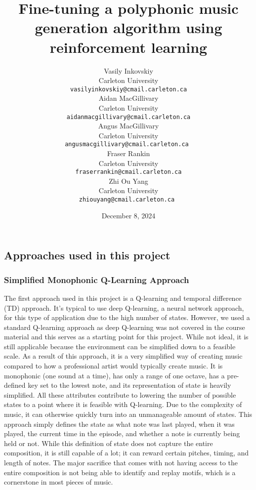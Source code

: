 \documentclass{article}
\title{ Fine-tuning a polyphonic music generation algorithm using reinforcement learning
}
\author{ 
Vasily Inkovskiy \\ 
Carleton University  \\
  \texttt{ vasilyinkovskiy@cmail.carleton.ca }\\
  Aidan MacGillivary\\ Carleton University  \\
  \texttt{aidanmacgillivary@cmail.carleton.ca} \\
  Angus MacGillivary\\
  Carleton University\\
  \texttt{angusmacgillivary@cmail.carleton.ca }\\
  Fraser Rankin\\Carleton University\\
  \texttt{fraserrankin@cmail.carleton.ca} \\
  Zhi Ou Yang \\Carleton University\\
  \texttt{zhiouyang@cmail.carleton.ca }}
\date{December 8, 2024}
\begin{document}
\maketitle{}

\subsection{Approaches used in this project}
\subsubsection{Simplified Monophonic Q-Learning Approach}
The first approach used in this project is a Q-learning and temporal difference (TD) approach. It's typical to use deep Q-learning, a neural network approach, for this type of application due to the high number of states. However, we used a standard Q-learning approach as deep Q-learning was not covered in the course material and this serves as a starting point for this project. While not ideal, it is still applicable because the environment can be simplified down to a feasible scale. As a result of this approach, it is a very simplified way of creating music compared to how a professional artist would typically create music. It is monophonic (one sound at a time), has only a range of one octave, has a pre-defined key set to the lowest note, and its representation of state is heavily simplified. All these attributes contribute to lowering the number of possible states to a point where it is feasible with Q-learning. Due to the complexity of music, it can otherwise quickly turn into an unmanageable amount of states. This approach simply defines the state as what note was last played, when it was played, the current time in the episode, and whether a note is currently being held or not. While this definition of state does not capture the entire composition, it is still capable of a lot; it can reward certain pitches, timing, and length of notes. The major sacrifice that comes with not having access to the entire composition is not being able to identify and replay motifs, which is a cornerstone in most pieces of music.
\end{document}

